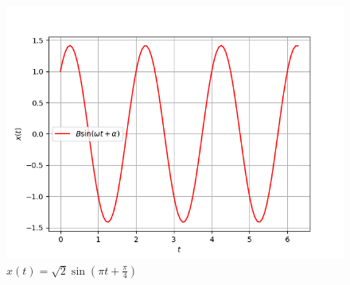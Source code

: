 \documentclass[journal,12pt,twocolumn]{IEEEtran}
\theoremstyle{remark}
\begin{document}
\begin{figure}[h]
\renewcommand\thefigure{2}
    \centering
    \includegraphics[width=0.8\columnwidth]{figs/fig2.png}
    \caption{$x(t) = \sqrt{2}\sin(\pi t + \frac{\pi}{4})$}
    \label{Fig2}
\end{figure}
\end{document}
